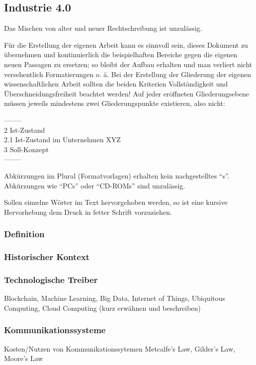 \subsection{Industrie 4.0}
Das Mischen von alter und neuer Rechtschreibung ist unzulässig.

Für die Erstellung der eigenen Arbeit kann es sinnvoll sein, dieses Dokument zu übernehmen  und kontinuierlich die beispielhaften Bereiche gegen die eigenen neuen Passagen zu ersetzen; so bleibt der Aufbau erhalten und man verliert nicht versehentlich Formatierungen o. ä. Bei der Erstellung der Gliederung der eigenen wissenschaftlichen Arbeit sollten die beiden Kriterien Vollständigkeit und Überschneidungsfreiheit beachtet werden! Auf jeder eröffneten Gliederungsebene müssen jeweils mindestens zwei Gliederungspunkte existieren, also nicht:

\noindent--------\\
2	Ist-Zustand\\
2.1	Ist-Zustand im Unternehmen XYZ\\
3	Soll-Konzept\\
--------

Abkürzungen im Plural (Formatvorlagen) erhalten kein nachgestelltes "`s"'. Abkürzungen wie "`PCs"' oder "`CD-ROMs"' sind unzulässig.

Sollen einzelne Wörter im Text hervorgehoben werden, so ist eine kursive Hervorhebung dem Druck in fetter Schrift  vorzuziehen.

\subsubsection{Definition}
\subsubsection{Historischer Kontext}
\subsubsection{Technologische Treiber}
Blockchain, Machine Learning, Big Data, Internet of Things, Ubiquitous Computing, Cloud Computing (kurz erwähnen und beschreiben)
\subsubsection{Kommunikationssysteme}
Kosten/Nutzen von Kommunikationssytemen
Metcalfe’s Law, Gilder’s Law, Moore’s Law
